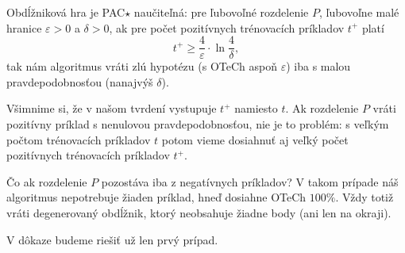 \begin{theorem}
  Obdĺžniková hra je PAC$\star$ naučiteľná: pre ľubovoľné rozdelenie $P$,
  ľubovoľne malé hranice $\varepsilon > 0$ a $\delta > 0$, ak pre počet
  pozitívnych trénovacích príkladov $t^+$ platí
  $$ t^+ \geq \frac{4}{\varepsilon} \cdot \ln{\frac{4}{\delta}}, $$
  tak nám algoritmus vráti zlú hypotézu (s OTeCh aspoň $\varepsilon$)
  iba s malou pravdepodobnosťou (nanajvýš $\delta$).
\end{theorem}

Všimnime si, že v našom tvrdení vystupuje $t^+$ namiesto $t$. Ak
rozdelenie $P$ vráti pozitívny príklad s nenulovou pravdepodobnosťou,
nie je to problém: s veľkým počtom trénovacích príkladov $t$ potom vieme
dosiahnuť aj veľký počet pozitívnych trénovacích príkladov $t^+$.

Čo ak rozdelenie $P$ pozostáva iba z negatívnych príkladov? V takom
prípade náš algoritmus nepotrebuje žiaden príklad, hneď dosiahne OTeCh
$100\%$. Vždy totiž vráti degenerovaný obdĺžnik, ktorý neobsahuje žiadne
body (ani len na okraji).

V dôkaze budeme riešiť už len prvý prípad.

